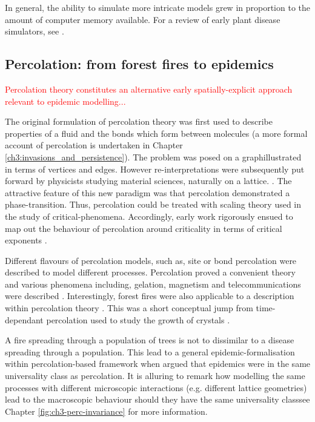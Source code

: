 In general, the ability to simulate more intricate models grew in proportion to the amount of computer memory available.
For a review of early plant disease simulators, see \cite{doi:10.1146/annurev.py.23.090185.002031}.

\subsection{Percolation: from forest fires to epidemics}
\label{section:lit-rev-perc}

\textcolor{red}{Percolation theory constitutes an alternative early spatially-explicit approach relevant to epidemic modelling...}

The original formulation of percolation theory was first used to describe properties of a fluid and the bonds which form between molecules \cite{perco_origin} (a more formal account of 
percolation is undertaken in Chapter \ref{ch3:invasions_and_persistence}). The problem was posed on a graph\textemdash illustrated in terms of vertices and edges. However re-interpretations were subsequently put forward by physicists studying material sciences, naturally on a lattice. \cite{Essam_1980}. The attractive feature of this new paradigm was that percolation demonstrated a phase-transition. Thus, percolation could be treated with scaling theory used in the study of critical-phenomena. Accordingly, early work rigorously ensued to map out the behaviour of percolation around criticality in terms of critical exponents \cite{STAUFFER19791}. 

Different flavours of percolation models, such as, site or bond percolation were described to model different processes. Percolation proved a convenient theory and various phenomena including, gelation, magnetism and telecommunications were described \cite{trove.nla.gov.au/work/26493727}. Interestingly, forest fires were also applicable to a description within percolation theory \cite{MacKay_1984}. This was a short conceptual jump from time-dependant percolation used to study the growth of crystals \cite{Family_1985}. 

A fire spreading through a population of trees is not to dissimilar to a disease spreading through a population. This lead to a general epidemic-formalisation within percolation-based framework when \cite{pub.1059067807} argued that epidemics were in the same universality class as percolation. It is alluring to remark how modelling the same processes with different microscopic interactions (e.g. different lattice geometries) lead to the macroscopic behaviour should they have the same universality class\textemdash see Chapter \ref{fig:ch3-perc-invariance} for more information.

